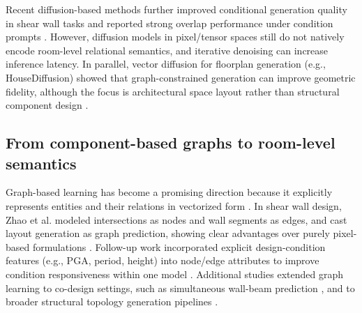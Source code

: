 Recent diffusion-based methods further improved conditional generation quality in shear wall tasks and reported strong overlap performance under condition prompts \cite{liFrameDiffusionLatentDiffusion2025}. However, diffusion models in pixel/tensor spaces still do not natively encode room-level relational semantics, and iterative denoising can increase inference latency. In parallel, vector diffusion for floorplan generation (e.g., HouseDiffusion) showed that graph-constrained generation can improve geometric fidelity, although the focus is architectural space layout rather than structural component design \cite{shabaniHouseDiffusionVectorFloorplan2022}.


\subsection{From component-based graphs to room-level semantics}
\label{subsec:graph_repr_gnn}

Graph-based learning has become a promising direction because it explicitly represents entities and their relations in vectorized form \cite{Wu_2021}. In shear wall design, Zhao et al. modeled intersections as nodes and wall segments as edges, and cast layout generation as graph prediction, showing clear advantages over purely pixel-based formulations \cite{zhaoIntelligentDesignShear2023b}. Follow-up work incorporated explicit design-condition features (e.g., PGA, period, height) into node/edge attributes to improve condition responsiveness within one model \cite{zhaoDesignconditioninformedShearWall2023d}. Additional studies extended graph learning to co-design settings, such as simultaneous wall-beam prediction \cite{IntelligentCodesignShear2025}, and to broader structural topology generation pipelines \cite{zhangEndtoendGenerationStructural,longTwostageAutomatedGeneration2026}.


